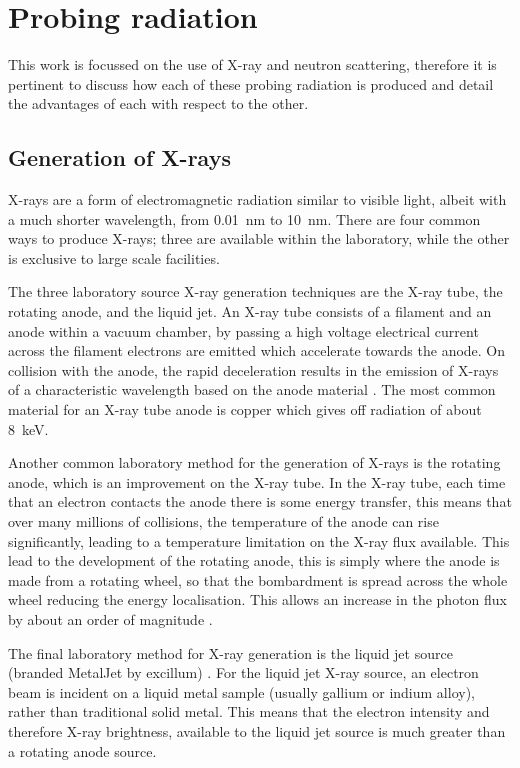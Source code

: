 \section{Probing radiation}

This work is focussed on the use of X-ray and neutron scattering, therefore it is pertinent to discuss how each of these probing radiation is produced and detail the advantages of each with respect to the other.

\subsection{Generation of X-rays}

X-rays are a form of electromagnetic radiation similar to visible light, albeit with a much shorter wavelength, from \SI{0.01}{\nano\meter} to \SI{10}{\nano\meter}.
There are four common ways to produce X-rays; three are available within the laboratory, while the other is exclusive to large scale facilities.

The three laboratory source X-ray generation techniques are the X-ray tube, the rotating anode, and the liquid jet.
An X-ray tube consists of a filament and an anode within a vacuum chamber, by passing a high voltage electrical current across the filament electrons are emitted which accelerate towards the anode.
On collision with the anode, the rapid deceleration results in the emission of X-rays of a characteristic wavelength based on the anode material \cite{schnablegger_saxs_2017}.
The most common material for an X-ray tube anode is copper which gives off radiation of about \SI{8}{\kilo\eV}.

Another common laboratory method for the generation of X-rays is the rotating anode, which is an improvement on the X-ray tube.
In the X-ray tube, each time that an electron contacts the anode there is some energy transfer, this means that over many millions of collisions, the temperature of the anode can rise significantly, leading to a temperature limitation on the X-ray flux available.
This lead to the development of the rotating anode, this is simply where the anode is made from a rotating wheel, so that the bombardment is spread across the whole wheel reducing the energy localisation.
This allows an increase in the photon flux by about an order of magnitude \cite{schnablegger_saxs_2017}.

The final laboratory method for X-ray generation is the liquid jet source (branded MetalJet by excillum) \cite{noauthor_metaljet_nodate}.
For the liquid jet X-ray source, an electron beam is incident on a liquid metal sample (usually gallium or indium alloy), rather than traditional solid metal.
This means that the electron intensity and therefore X-ray brightness, available to the liquid jet source is much greater than a rotating anode source.

